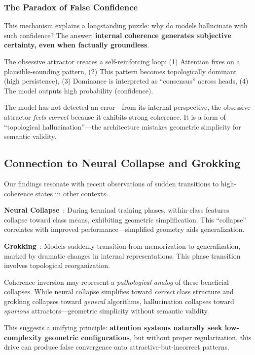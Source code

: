\documentclass[11pt,twocolumn]{article}
\begin{document}
\subsubsection{The Paradox of False Confidence}

This mechanism explains a longstanding puzzle: why do models hallucinate with such confidence? The answer: \textbf{internal coherence generates subjective certainty, even when factually groundless}.

The obsessive attractor creates a self-reinforcing loop: (1) Attention fixes on a plausible-sounding pattern, (2) This pattern becomes topologically dominant (high persistence), (3) Dominance is interpreted as ``consensus'' across heads, (4) The model outputs high probability (confidence).

The model has not detected an error---from its internal perspective, the obsessive attractor \textit{feels correct} because it exhibits strong coherence. It is a form of ``topological hallucination''---the architecture mistakes geometric simplicity for semantic validity.

\subsection{Connection to Neural Collapse and Grokking}

Our findings resonate with recent observations of sudden transitions to high-coherence states in other contexts.

\textbf{Neural Collapse}~\cite{papyan2020prevalence}: During terminal training phases, within-class features collapse toward class means, exhibiting geometric simplification. This ``collapse'' correlates with improved performance---simplified geometry aids generalization.

\textbf{Grokking}~\cite{power2022grokking,nanda2023progress}: Models suddenly transition from memorization to generalization, marked by dramatic changes in internal representations. This phase transition involves topological reorganization.

Coherence inversion may represent a \textit{pathological analog} of these beneficial collapses. While neural collapse simplifies toward \textit{correct} class structure and grokking collapses toward \textit{general} algorithms, hallucination collapses toward \textit{spurious} attractors---geometric simplicity without semantic validity.

This suggests a unifying principle: \textbf{attention systems naturally seek low-complexity geometric configurations}, but without proper regularization, this drive can produce false convergence onto attractive-but-incorrect patterns.
\end{document}
